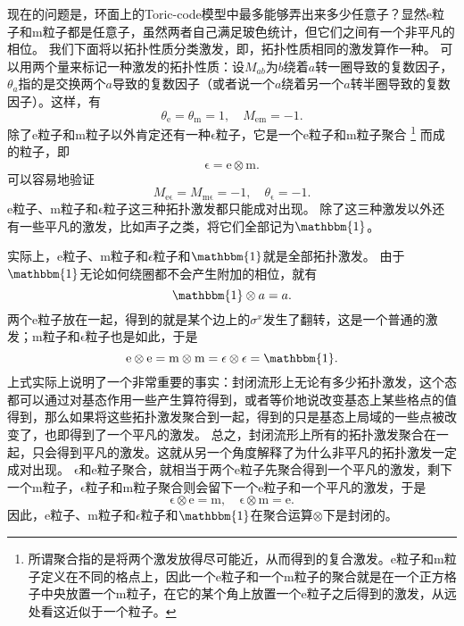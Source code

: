 \documentclass[hyperref, UTF8, a4paper]{ctexart}
\begin{document}
现在的问题是，环面上的Toric-code模型中最多能够弄出来多少任意子？显然e粒子和m粒子都是任意子，虽然两者自己满足玻色统计，但它们之间有一个非平凡的相位。
我们下面将以拓扑性质分类激发，即，拓扑性质相同的激发算作一种。
可以用两个量来标记一种激发的拓扑性质：设$M_{ab}$为$b$绕着$a$转一圈导致的复数因子，$\theta_a$指的是交换两个$a$导致的复数因子（或者说一个$a$绕着另一个$a$转半圈导致的复数因子）。这样，有
\begin{equation}
    \theta_\mathrm{e} = \theta_\mathrm{m} = 1, \quad M_\mathrm{em} = - 1.
\end{equation}
除了e粒子和m粒子以外肯定还有一种$\mathrm{\epsilon}$粒子，它是一个e粒子和m粒子聚合%
\footnote{所谓聚合指的是将两个激发放得尽可能近，从而得到的复合激发。e粒子和m粒子定义在不同的格点上，因此一个e粒子和一个m粒子的聚合就是在一个正方格子中央放置一个m粒子，在它的某个角上放置一个e粒子之后得到的激发，从远处看这近似于一个粒子。}%
而成的粒子，即
\begin{equation}
    \mathrm{\epsilon} = \mathrm{e} \otimes \mathrm{m}.
\end{equation}
可以容易地验证
\begin{equation}
    M_\mathrm{e\epsilon} = M_\mathrm{m\epsilon} = -1, \quad \theta_\mathrm{\epsilon} = -1.
\end{equation}
e粒子、m粒子和$\mathrm{\epsilon}$粒子这三种拓扑激发都只能成对出现。
除了这三种激发以外还有一些平凡的激发，比如声子之类，将它们全部记为$\mathbbm{1}$。

实际上，e粒子、m粒子和$\epsilon$粒子和$\mathbbm{1}$就是全部拓扑激发。
由于$\mathbbm{1}$无论如何绕圈都不会产生附加的相位，就有
\[
    \mathbbm{1} \otimes a = a.
\]
两个e粒子放在一起，得到的就是某个边上的$\sigma^x$发生了翻转，这是一个普通的激发；m粒子和$\mathrm{\epsilon}$粒子也是如此，于是
\[
    \mathrm{e} \otimes \mathrm{e} = \mathrm{m} \otimes \mathrm{m} = \mathrm{\epsilon} \otimes \mathrm{\epsilon} = \mathbbm{1}.
\]
上式实际上说明了一个非常重要的事实：封闭流形上无论有多少拓扑激发，这个态都可以通过对基态作用一些产生算符得到，或者等价地说改变基态上某些格点的值得到，那么如果将这些拓扑激发聚合到一起，得到的只是基态上局域的一些点被改变了，也即得到了一个平凡的激发。
总之，封闭流形上所有的拓扑激发聚合在一起，只会得到平凡的激发。这就从另一个角度解释了为什么非平凡的拓扑激发一定成对出现。
$\mathrm{\epsilon}$和e粒子聚合，就相当于两个e粒子先聚合得到一个平凡的激发，剩下一个m粒子，$\mathrm{\epsilon}$粒子和m粒子聚合则会留下一个e粒子和一个平凡的激发，于是
\[
    \mathrm{\epsilon} \otimes \mathrm{e} = \mathrm{m}, \quad \mathrm{\epsilon} \otimes \mathrm{m} = \mathrm{e}.
\]
因此，e粒子、m粒子和$\epsilon$粒子和$\mathbbm{1}$在聚合运算$\otimes$下是封闭的。
\end{document}
